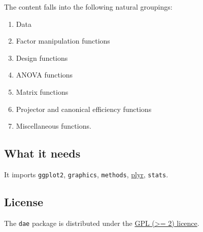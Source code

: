 \documentclass[
]{article}
\begin{document}
The content falls into the following natural groupings:

\begin{enumerate}
\def\labelenumi{(\roman{enumi})}
\item
  Data
\item
  Factor manipulation functions
\item
  Design functions
\item
  ANOVA functions
\item
  Matrix functions
\item
  Projector and canonical efficiency functions
\item
  Miscellaneous functions.
\end{enumerate}

\hypertarget{what-it-needs}{%
\subsection{What it needs}\label{what-it-needs}}

It imports \texttt{ggplot2}, \texttt{graphics}, \texttt{methods},
\href{https://CRAN.R-project.org/package=plyr}{plyr}, \texttt{stats}.

\hypertarget{license}{%
\subsection{License}\label{license}}

The \texttt{dae} package is distributed under the
\href{https://opensource.org/licenses/GPL-2.0}{GPL (\textgreater= 2)
licence}.
\end{document}
